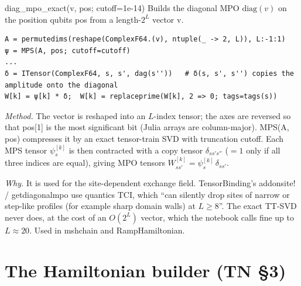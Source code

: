 \documentclass[11pt]{article}
\newcommand{\codeus}{\textunderscore\allowbreak}
\renewcommand{\code}[1]{{\ttfamily\let\_\codeus #1}}
\begin{document}
\begin{function}{diag\_mpo\_exact(v, pos; cutoff=1e-14)}
Builds the diagonal MPO $\mathrm{diag}(v)$ on the position qubits \code{pos} from a length-$2^L$ vector \code{v}.
\begin{Verbatim}
A = permutedims(reshape(ComplexF64.(v), ntuple(_ -> 2, L)), L:-1:1)
ψ = MPS(A, pos; cutoff=cutoff)
...
δ = ITensor(ComplexF64, s, s', dag(s''))   # δ(s, s', s'') copies the amplitude onto the diagonal
W[k] = ψ[k] * δ;  W[k] = replaceprime(W[k], 2 => 0; tags=tags(s))
\end{Verbatim}
\emph{Method.} The vector is reshaped into an $L$-index tensor; the axes are reversed so that \code{pos[1]} is the most significant bit (Julia arrays are column-major). \code{MPS(A, pos)} compresses it by an exact tensor-train SVD with truncation \code{cutoff}. Each MPS tensor $\psi^{[k]}_{s}$ is then contracted with a copy tensor $\delta_{s s' s''}$ ($=1$ only if all three indices are equal), giving MPO tensors $W^{[k]}_{s s'}=\psi^{[k]}_s\,\delta_{ss'}$.

\emph{Why.} It is used for the site-dependent exchange field. TensorBinding's \code{add\_onsite!} / \code{get\_diagonal\_mpo} use quantics TCI, which ``can silently drop sites of narrow or step-like profiles (for example sharp domain walls) at $L\ge 8$''. The exact TT-SVD never does, at the cost of an $O(2^L)$ vector, which the notebook calls fine up to $L\approx20$. Used in \code{msh\_chain} and \code{RampHamiltonian}.
\end{function}

\section{The Hamiltonian builder (TN §3)}
\end{document}
